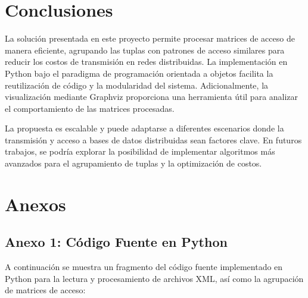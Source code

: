 \documentclass[letterpaper,12pt]{article}
\begin{document}
\begin{multicols}{2}
    \newpage

    \section*{Conclusiones}
    La solución presentada en este proyecto permite procesar matrices de acceso de manera eficiente, agrupando las tuplas con patrones de acceso similares para reducir los costos de transmisión en redes distribuidas. La implementación en Python bajo el paradigma de programación orientada a objetos facilita la reutilización de código y la modularidad del sistema. Adicionalmente, la visualización mediante Graphviz proporciona una herramienta útil para analizar el comportamiento de las matrices procesadas.

    La propuesta es escalable y puede adaptarse a diferentes escenarios donde la transmisión y acceso a bases de datos distribuidas sean factores clave. En futuros trabajos, se podría explorar la posibilidad de implementar algoritmos más avanzados para el agrupamiento de tuplas y la optimización de costos.

    \newpage
    \section*{Anexos}

    \subsection*{Anexo 1: Código Fuente en Python}
    A continuación se muestra un fragmento del código fuente implementado en Python para la lectura y procesamiento de archivos XML, así como la agrupación de matrices de acceso:


\end{multicols}
\end{document}
